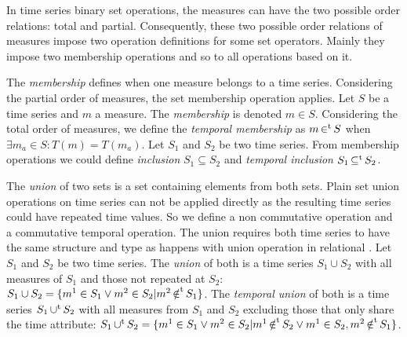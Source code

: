 In time series binary set operations, the measures can have the two
possible order relations: total and partial. Consequently, these two
possible order relations of measures impose two operation definitions
for some set operators.  Mainly they impose two membership operations
and so to all operations based on it.


The \emph{membership} defines when one measure belongs to a time
series. Considering the partial order of measures, the set
membership operation applies. Let $S$ be a time series and $m$ a
measure. The \emph{membership} is denoted $m \in S$. Considering the
total order of measures, we define the \emph{temporal membership}
as $m \operatorname*{\in^t} S$ when $\exists m_a \in S : T(m) = T(m_a)$.  Let $S_1$
and $S_2$ be two time series. From membership operations we could
define \emph{inclusion} $S_1\subseteq S_2$ and \emph{temporal
  inclusion} $S_1\operatorname*{\subseteq^t} S_2$.


The \emph{union} of two sets is a set containing elements from both
sets. Plain set union operations on time series can not be applied
directly as the resulting time series could have repeated time values.
So we define a non commutative operation and a commutative temporal
operation. The union requires both time series to have the same
structure and type as happens with union operation in relational
 \cite{date:introduction}. %
Let $S_1$ and $S_2$ be two time series. The \emph{union} of both is a
time series $S_1 \cup S_2$ with all measures of $S_1$ and those not
repeated at $S_2$: $S_1 \cup S_2 = \{m^1 \in S_1 \vee m^2 \in S_2 |
m^2 \operatorname*{\notin^t} S_1 \}$. The \emph{temporal union} of both is a time
series $S_1 \operatorname*{\cup^t} S_2$ with all measures from $S_1$ and $S_2$
excluding those that only share the time attribute: $S_1 \operatorname*{\cup^t} S_2 =
\{ m^1 \in S_1 \vee m^2 \in S_2 | m^1 \operatorname*{\notin^t} S_2 \vee m^1 \in S_2,
m^2 \operatorname*{\notin^t} S_1 \}$.

